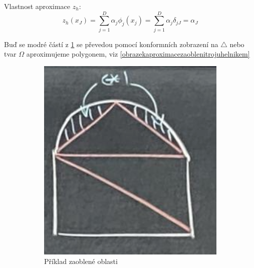 \documentclass[../main.tex]{subfiles}
\begin{document}
Vlastnost aproximace $z_h$:
\begin{equation}
    z_h(x_J) = \sum_{j=1}^D \alpha_j \phi_j (x_j)= \sum_{j=1}^D \alpha_j \delta_{jJ} = \alpha_J
\end{equation}

\newpage

\begin{remark} 
\hfill\break
Buď se modré částí z \ref{obrazekzaoblenaoblast} se převedou pomocí konformních zobrazení na $\triangle$ nebo tvar $\Omega$ aproximujeme polygonem, viz \ref{obrazekaproximacezaoblenitrojuhelnikem}
\end{remark}

\begin{figure}[h]
    \centering
    \begin{subfigure}[t]{0.49\textwidth}
        \centering
        \includegraphics[width=1\textwidth]{images/obrazekzaoblenaoblast.png}
        \caption{Příklad zaoblené oblasti}
        \label{obrazekzaoblenaoblast}
    \end{subfigure}
    \hfill
    \begin{subfigure}[t]{0.49\textwidth}
        \centering

\end{subfigure}
\end{figure}
\end{document}
